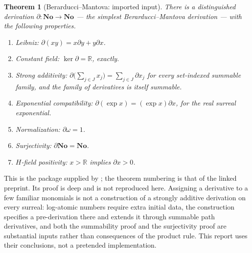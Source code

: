 \documentclass[11pt,letterpaper]{article}
\numberwithin{equation}{section}
\newtheorem{theorem}{Theorem}[section]
\theoremstyle{definition}
\theoremstyle{remark}
\newcommand{\No}{\mathbf{No}}
\newcommand{\R}{\mathbb R}
\newcommand{\der}{\partial}
\newcommand{\Ker}{\operatorname{ker}}
\begin{document}
\begin{theorem}[Berarducci--Mantova: imported input]
\label{diff:thm:BM}
There is a distinguished derivation $\der:\No\to\No$ --- the simplest
Berarducci--Mantova derivation --- with the following properties.
\begin{enumerate}[label=\textup{(BM\arabic*)},leftmargin=3.4em]
\item\label{diff:BM:leibniz} Leibniz: $\der(xy)=x\der y+y\der x$.
\item\label{diff:BM:const} Constant field: $\Ker\der=\R$, exactly.
\item\label{diff:BM:additive} Strong additivity:
$\der\bigl(\sum_{j\in J}x_{j}\bigr)=\sum_{j\in J}\der x_{j}$ for every
set-indexed summable family, \emph{and} the family of derivatives is itself
summable.
\item\label{diff:BM:exp} Exponential compatibility:
$\der(\exp x)=(\exp x)\der x$, for the real surreal exponential.
\item\label{diff:BM:norm} Normalization: $\der\omega=1$.
\item\label{diff:BM:surj} Surjectivity: $\der\No=\No$.
\item\label{diff:BM:positivity} $H$-field positivity: $x>\R$ implies
$\der x>0$.
\end{enumerate}
\end{theorem}

This is the package supplied by \cite[Theorems A/6.30 and B/7.7]{BM}; the
theorem numbering is that of the linked preprint. Its proof is deep and is not
reproduced here. Assigning a derivative to a few familiar monomials is not a
construction of a strongly additive derivation on every surreal: log-atomic
numbers require extra initial data, the construction specifies a
pre-derivation there and extends it through summable path derivatives, and both
the summability proof and the surjectivity proof are substantial inputs rather
than consequences of the product rule. This report uses their conclusions, not
a pretended implementation.
\end{document}
